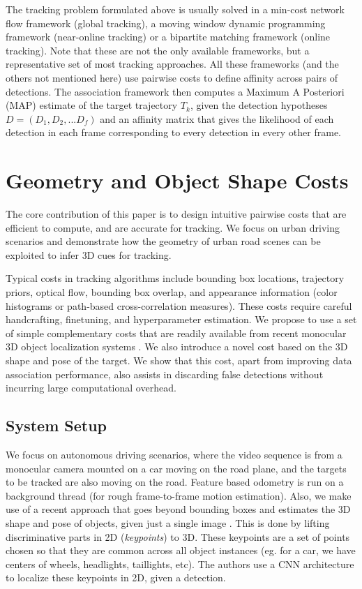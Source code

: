 \documentclass[letterpaper, 10 pt, conference]{ieeeconf}
\begin{document}
The tracking problem formulated above is usually solved in a min-cost network flow framework (global tracking), a moving window dynamic programming framework (near-online tracking) or a bipartite matching framework (online tracking). Note that these are not the only available frameworks, but a representative set of most tracking approaches. All these frameworks (and the others not mentioned here) use pairwise costs to define affinity across pairs of detections. The association framework then computes a Maximum A Posteriori (MAP) estimate of the target trajectory $T_k$, given the detection hypotheses $D = \left(D_1, D_2, ... D_f\right)$ and an affinity matrix that gives the likelihood of each detection in each frame corresponding to every detection in every other frame.


\section{Geometry and Object Shape Costs}

The core contribution of this paper is to design intuitive pairwise costs that are efficient to compute, and are accurate for tracking. We focus on urban driving scenarios and demonstrate how the geometry of urban road scenes can be exploited to infer 3D cues for tracking.

Typical costs in tracking algorithms include bounding box locations, trajectory priors, optical flow, bounding box overlap, and appearance information (color histograms or path-based cross-correlation measures). These costs require careful handcrafting, finetuning, and hyperparameter estimation. We propose to use a set of simple complementary costs that are readily available from recent monocular 3D object localization systems \cite{KM_ICRA,KM_IROS}. We also introduce a novel cost based on the 3D shape and pose of the target. We show that this cost, apart from improving data association performance, also assists in discarding false detections without incurring large computational overhead.

\subsection{System Setup}

We focus on autonomous driving scenarios, where the video sequence is from a monocular camera mounted on a car moving on the road plane, and the targets to be tracked are also moving on the road. Feature based odometry is run on a background thread (for rough frame-to-frame motion estimation). Also, we make use of a recent approach that goes beyond bounding boxes and estimates the 3D shape and pose of objects, given just a single image \cite{KM_ICRA}. This is done by lifting discriminative parts in 2D (\emph{keypoints}) to 3D. These keypoints are a set of points chosen so that they are common across all object instances (eg. for a car, we have centers of wheels, headlights, taillights, etc). The authors use a CNN architecture \cite{KM_IROS} to localize these keypoints in 2D, given a detection.
\end{document}
